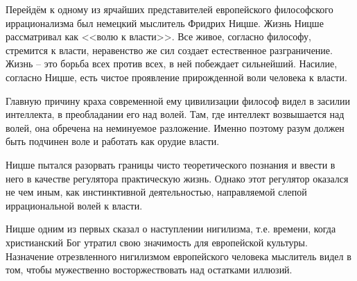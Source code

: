 Перейдём к одному из ярчайших представителей европейского философского иррационализма был немецкий мыслитель 
Фридрих Ницше. Жизнь Ницше рассматривал как <<волю к власти>>. Все живое, согласно философу, стремится к 
власти, неравенство же сил создает естественное разграничение. Жизнь -- это борьба всех против всех, в ней 
побеждает сильнейший. Насилие, согласно Ницше, есть чистое проявление прирожденной воли человека к власти.

Главную причину краха современной ему цивилизации философ видел в засилии интеллекта, в преобладании его над 
волей. Там, где интеллект возвышается над волей, она обречена на неминуемое разложение. Именно поэтому разум 
должен быть подчинен воле и работать как орудие власти.

Ницше пытался разорвать границы чисто теоретического познания и ввести в него в качестве регулятора 
практическую жизнь. Однако этот регулятор оказался не чем иным, как инстинктивной деятельностью, направляемой 
слепой иррациональной волей к власти.

Ницше одним из первых сказал о наступлении нигилизма, т.е. времени, когда христианский Бог утратил свою 
значимость для европейской культуры. Назначение отрезвленного нигилизмом европейского человека мыслитель 
видел в том, чтобы мужественно восторжествовать над остатками иллюзий.